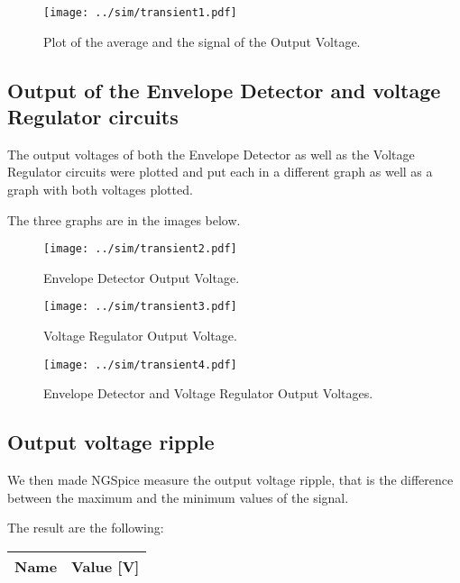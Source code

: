 \begin{figure}[H] \centering
\texttt{[image: ../sim/transient1.pdf]}
\caption{Plot of the average and the signal of the Output Voltage.}
\label{fig:transient1}
\end{figure}

\subsection{Output of the Envelope Detector and voltage Regulator circuits}
The output voltages of both the Envelope Detector as well as the Voltage Regulator circuits were plotted and put each in a different graph as well as a graph with both voltages plotted. \par
The three graphs are in the images below.

\begin{figure}[H] \centering
\texttt{[image: ../sim/transient2.pdf]}
\caption{Envelope Detector Output Voltage.}
\label{fig:transient2}
\end{figure}

\begin{figure}[H] \centering
\texttt{[image: ../sim/transient3.pdf]}
\caption{Voltage Regulator Output Voltage.}
\label{fig:transient3}
\end{figure}

\begin{figure}[H] \centering
\texttt{[image: ../sim/transient4.pdf]}
\caption{Envelope Detector and Voltage Regulator Output Voltages.}
\label{fig:transient4}
\end{figure}

\subsection{Output voltage ripple}
We then made NGSpice measure the output voltage ripple, that is the difference between the maximum and the minimum values of the signal. \par
The result are the following:

\begin{table}[H]
  \centering
  \begin{tabular}{|l|r|}
    \hline    
    {\bf Name} & {\bf Value [V]} \\ \hline
    
  \end{tabular}
  \label{tab:ripple}
\end{table}

